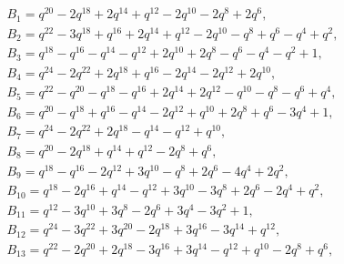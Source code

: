 \documentclass[pdftex]{sigma}
\numberwithin{equation}{section}
\theoremstyle{definition}
\newcommand{\flac}[2]{#1}
\begin{document}
\begin{gather*}
 B_1 =
\flac{q^{20}}{a^2}-\flac{2q^{18}}{a^2}+\flac{2q^{14}}{a^2}+\flac{q^{12}}{a^2}-\flac{2q^{10}}{a^2}-\flac{2q^{8}}{a^2}+\flac{2q^{6}}{a^2},\\
 B_2 =
\flac{q^{22}}{a^2}-\flac{3q^{18}}{a^2}+\flac{q^{16}}{a^2}+\flac{2q^{14}}{a^2}+\flac{q^{12}}{a^2}-\flac{2q^{10}}{a^2}-\flac{q^{8}}{a^2}+\flac{q^{6}}{a^2}-\flac{q^{4}}{a^2}+\flac{q^{2}}{a^2}, \\
 B_3 =
\flac{q^{18}}{a^2}-\flac{q^{16}}{a^2}-\flac{q^{14}}{a^2}-\flac{q^{12}}{a^2}+\flac{2q^{10}}{a^2}+\flac{2q^{8}}{a^2}-\flac{q^{6}}{a^2}-\flac{q^{4}}{a^2}-\flac{q^{2}}{a^2}+\flac{1}{a^2}, \\
 B_4 =
\flac{q^{24}}{a^2}-\flac{2q^{22}}{a^2}+\flac{2q^{18}}{a^2}+\flac{q^{16}}{a^2}-\flac{2q^{14}}{a^2}-\flac{2q^{12}}{a^2}+\flac{2q^{10}}{a^2}, \\
 B_5 =
\flac{q^{22}}{a^2}-\flac{q^{20}}{a^2}-\flac{q^{18}}{a^2}-\flac{q^{16}}{a^2}+\flac{2q^{14}}{a^2}+\flac{2q^{12}}{a^2}-\flac{q^{10}}{a^2}-\flac{q^{8}}{a^2}-\flac{q^{6}}{a^2}+\flac{q^{4}}{a^2}, \\
 B_6 =
\flac{q^{20}}{a^2}-\flac{q^{18}}{a^2}+\flac{q^{16}}{a^2}-\flac{q^{14}}{a^2}-\flac{2q^{12}}{a^2}+\flac{q^{10}}{a^2}+\flac{2q^{8}}{a^2}+\flac{q^{6}}{a^2}-\flac{3q^{4}}{a^2}+\flac{1}{a^2}, \\
 B_7 =
\flac{q^{24}}{a^2}-\flac{2q^{22}}{a^2}+\flac{2q^{18}}{a^2}-\flac{q^{14}}{a^2}-\flac{q^{12}}{a^2}+\flac{q^{10}}{a^2}, \\
 B_8 =
\flac{q^{20}}{a^2}-\flac{2q^{18}}{a^2}+\flac{q^{14}}{a^2}+\flac{q^{12}}{a^2}-\flac{2q^{8}}{a^2}+\flac{q^{6}}{a^2}, \\
 B_9 =
\flac{q^{18}}{a^2}-\flac{q^{16}}{a^2}-\flac{2q^{12}}{a^2}+\flac{3q^{10}}{a^2}-\flac{q^{8}}{a^2}+\flac{2q^{6}}{a^2}-\flac{4q^{4}}{a^2}+\flac{2q^{2}}{a^2}, \\
 B_{10} =
\flac{q^{18}}{a^2}-\flac{2q^{16}}{a^2}+\flac{q^{14}}{a^2}-\flac{q^{12}}{a^2}+\flac{3q^{10}}{a^2}-\flac{3q^{8}}{a^2}+\flac{2q^{6}}{a^2}-\flac{2q^{4}}{a^2}+\flac{q^{2}}{a^2}, \\
 B_{11} =
\flac{q^{12}}{a^2}-\flac{3q^{10}}{a^2}+\flac{3q^{8}}{a^2}-\flac{2q^{6}}{a^2}+\flac{3q^{4}}{a^2}-\flac{3q^{2}}{a^2}+\flac{1}{a^2}, \\
 B_{12} =
\flac{q^{24}}{a^2}-\flac{3q^{22}}{a^2}+\flac{3q^{20}}{a^2}-\flac{2q^{18}}{a^2}+\flac{3q^{16}}{a^2}-\flac{3q^{14}}{a^2}+\flac{q^{12}}{a^2}, \\
 B_{13} =
\flac{q^{22}}{a^2}-\flac{2q^{20}}{a^2}+\flac{2q^{18}}{a^2}-\flac{3q^{16}}{a^2}+\flac{3q^{14}}{a^2}-\flac{q^{12}}{a^2}+\flac{q^{10}}{a^2}-\flac{2q^{8}}{a^2}+\flac{q^{6}}{a^2}, \\

\end{gather*}
\end{document}

